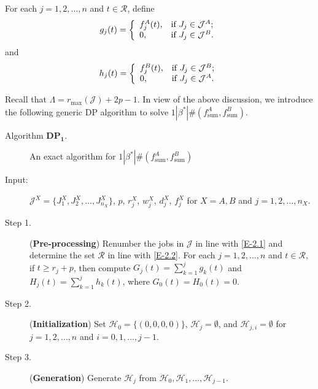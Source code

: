 \documentclass[12pt]{article}
\begin{document}
\begin{sloppypar}
For each $j=1, 2, \ldots, n$ and $t \in \mathcal{R}$, define
\begin{equation}\label{E-5.1}
g_j(t)=\left\{
\begin{array}{ll}
f_j^A(t), & \hbox{if} ~ J_j \in \mathcal{J}^A; \\
0, & \hbox{if} ~ J_j \in \mathcal{J}^B.\\
\end{array}
\right.
\end{equation}
and
\begin{equation}\label{E-5.2}
h_j(t)=\left\{
\begin{array}{ll}
f_j^B(t), & \hbox{if} ~ J_j \in \mathcal{J}^B; \\
0, & \hbox{if} ~ J_j \in \mathcal{J}^A.\\
\end{array}
\right.
\end{equation}

Recall that $\Lambda=r_{\max}(\mathcal{J})+2p-1$. In view of the above discussion, we introduce the following generic DP algorithm to solve $1 | \beta^{*}|\#(f_{\mathrm{sum}}^A, f_{\mathrm{sum}}^B)$. 


\begin{description}
\item [Algorithm $\mathbf{DP_1}$.] An exact algorithm for $1 | \beta^{*}|\#(f_{\mathrm{sum}}^A, f_{\mathrm{sum}}^B)$

\item [Input:] ${\mathcal J}^{X}=\{J_1^{X}, J_2^{X}, \ldots, J_{n_X}^{X}\}$, $p$, $r_j^X$, $w_j^X$, $d_j^X$, $f_j^X$ for $X = A,B$ and $j=1, 2, \ldots, n_X$.

\item [Step 1.] (\textbf{Pre-processing}) Renumber the jobs in $\mathcal{J}$ in line with \eqref{E-2.1}
and determine the set $\mathcal{R}$ in line with \eqref{E-2.2}. For each $j=1, 2, \ldots, n$ and $t \in \mathcal{R}$, if $t \geq r_j+p$, then compute $G_j(t)=\sum_{k=1}^j g_k(t)$ and $H_j(t)=\sum_{k=1}^j h_k(t)$, where $G_0(t)=H_0(t)=0$.

\item [Step 2.] (\textbf{Initialization}) Set $\mathcal{H}_0=\{(0,0,0,0)\}$, ${\mathcal H}_j=\emptyset$, and $\mathcal{H}_{j,i}=\emptyset$ for $j=1, 2, \ldots, n$ and $i=0, 1, \ldots, j-1$.

\item [Step 3.] (\textbf{Generation}) Generate ${\mathcal H}_j$ from ${\mathcal H}_0, {\mathcal H}_1, \ldots, {\mathcal H}_{j-1}$.


\end{description}
\end{sloppypar}
\end{document}

